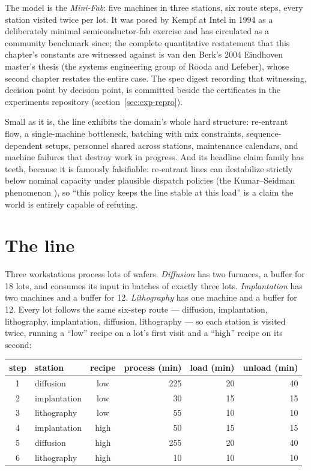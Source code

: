 The model is the \emph{Mini-Fab}: five machines in three stations,
six route steps, every station visited twice per lot. It was posed by
Kempf at Intel in 1994 as a deliberately minimal semiconductor-fab
exercise and has circulated as a community benchmark since; the
complete quantitative restatement that this chapter's constants are
witnessed against is van den Berk's 2004 Eindhoven master's thesis \cite{vandenberk04}
(the systems engineering group of Rooda and Lefeber), whose second
chapter restates the entire case. The spec digest recording that
witnessing, decision point by decision point, is committed beside the
certificates in the experiments repository
(section~\ref{sec:exp-repro}).

Small as it is, the line exhibits the domain's whole hard structure:
re-entrant flow, a single-machine bottleneck, batching with mix
constraints, sequence-dependent setups, personnel shared across
stations, maintenance calendars, and machine failures that destroy
work in progress. And its headline claim family has teeth, because it
is famously falsifiable: re-entrant lines can destabilize strictly
below nominal capacity under plausible dispatch policies (the
Kumar--Seidman phenomenon \cite{kumar1990dynamic}), so ``this policy
keeps the line stable at this load'' is a claim the world is entirely
capable of refuting.

\section{The line}
\label{sec:minifab-line}

Three workstations process lots of wafers. \emph{Diffusion} has two
furnaces, a buffer for 18 lots, and consumes its input in batches of
exactly three lots. \emph{Implantation} has two machines and a buffer
for 12. \emph{Lithography} has one machine and a buffer for 12. Every
lot follows the same six-step route --- diffusion, implantation,
lithography, implantation, diffusion, lithography --- so each station
is visited twice, running a ``low'' recipe on a lot's first visit and
a ``high'' recipe on its second:

\begin{center}\small
\begin{tabular}{@{}clcrrr@{}}
\toprule
step & station & recipe & process (min) & load (min) & unload (min)\\
\midrule
1 & diffusion     & low  & 225 & 20 & 40\\
2 & implantation  & low  &  30 & 15 & 15\\
3 & lithography   & low  &  55 & 10 & 10\\
4 & implantation  & high &  50 & 15 & 15\\
5 & diffusion     & high & 255 & 20 & 40\\
6 & lithography   & high &  10 & 10 & 10\\
\bottomrule
\end{tabular}
\end{center}


